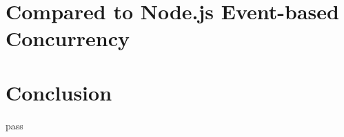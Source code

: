 \documentclass[letterpaper,twocolumn,10pt]{article}
\begin{document}
\section{Compared to Node.js Event-based Concurrency}



\section{Conclusion}

pass


% 

\end{document}
